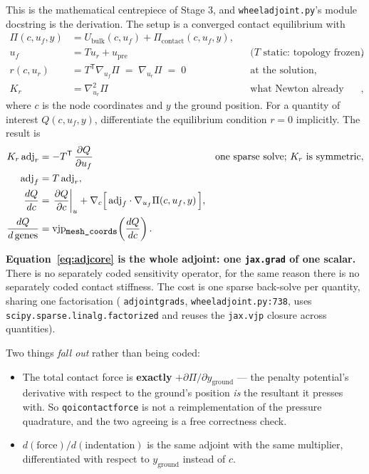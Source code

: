 \documentclass[11pt,a4paper]{article}
\DeclareRobustCommand{\code}[1]{%
  \texttt{\small\def\_{\textunderscore\discretionary{}{}{}}#1}}
\newcommand{\at}[2]{\code{#1:#2}}
\begin{document}
This is the mathematical centrepiece of Stage 3, and \code{wheel\_adjoint.py}'s module
docstring is the derivation. The setup is a converged contact equilibrium with
%
\begin{align}
  \Pi(c, u_f, y) &= U_{\text{bulk}}(c, u_f) + \Pi_{\text{contact}}(c, u_f, y), \\
  u_f            &= T u_r + u_{\text{pre}}
                    &&\text{($T$ static: topology frozen)}, \\
  r(c, u_r)      &= T^{\mathsf T}\nabla_{u_f}\Pi \;=\; \nabla_{u_r}\Pi \;=\; 0
                    &&\text{at the solution}, \\
  K_r            &= \nabla^2_{u_r}\Pi
                    &&\text{what Newton already assembled},
\end{align}
%
where $c$ is the node coordinates and $y$ the ground position. For a quantity of
interest $Q(c, u_f, y)$, differentiate the equilibrium condition $r = 0$ implicitly.
The result is
%
\begin{align}
  K_r\,\mathrm{adj}_r &= -T^{\mathsf T}\,\frac{\partial Q}{\partial u_f}
     &&\text{one sparse solve; $K_r$ is symmetric},
     \label{eq:adjsolve}\\
  \mathrm{adj}_f &= T\,\mathrm{adj}_r, \\
  \frac{dQ}{dc} &= \left.\frac{\partial Q}{\partial c}\right|_{u}
     + \nabla_c\Bigl[\,\mathrm{adj}_f \cdot \nabla_{u_f}\Pi(c, u_f, y)\,\Bigr],
     \label{eq:adjcore}\\
  \frac{dQ}{d\,\mathrm{genes}} &=
     \mathrm{vjp}_{\code{mesh\_coords}}\!\left(\frac{dQ}{dc}\right).
\end{align}

\textbf{Equation~\eqref{eq:adjcore} is the whole adjoint: one \code{jax.grad} of one
scalar.} There is no separately coded sensitivity operator, for the same reason there
is no separately coded contact stiffness. The cost is one sparse back-solve per
quantity, sharing one factorisation (\code{adjoint\_grads},
\at{wheel\_adjoint.py}{738}, uses \code{scipy.sparse.linalg.factorized} and reuses the
\code{jax.vjp} closure across quantities).

Two things \emph{fall out} rather than being coded:

\begin{itemize}
\item The total contact force is \textbf{exactly} $+\partial\Pi/\partial y_{\text{ground}}$
  --- the penalty potential's derivative with respect to the ground's position \emph{is}
  the resultant it presses with. So \code{\_qoi\_contact\_force} is not a
  reimplementation of the pressure quadrature, and the two agreeing is a free
  correctness check.
\item $d(\text{force})/d(\text{indentation})$ is the same adjoint with the same
  multiplier, differentiated with respect to $y_{\text{ground}}$ instead of $c$.
\end{itemize}
\end{document}
